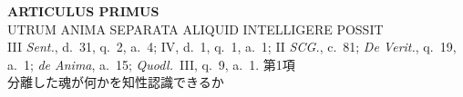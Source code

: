 \documentclass[paper=a4paper,fontsize=10pt,jafontsize=9pt,titlepage]{jlreq}
\begin{document}
\newpage
{}

{}
\setcounter{section}{1}
\setcounter{subsection}{0}
\begin{center}
{\bfseries \Large ARTICULUS PRIMUS}\\
{\large UTRUM ANIMA SEPARATA ALIQUID INTELLIGERE POSSIT}\\
{\footnotesize III {\itshape Sent.}, d.~31, q.~2, a.~4; IV, d.~1, q.~1, a.~1; II
 {\itshape SCG.},
 c.~81; {\itshape De Verit.}, q.~19, a.~1; {\itshape de Anima}, a.~15; {\itshape Quodl.}~III, q.~9,
 a.~1.}
{\Large 第1項\\分離した魂が何かを知性認識できるか}

\end{center}
\end{document}

